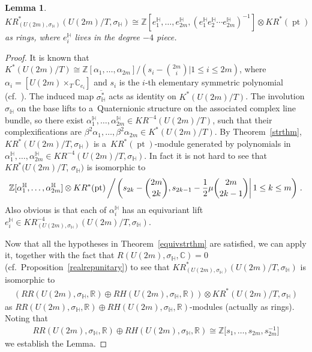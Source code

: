 \documentclass[11pt]{article}
\numberwithin{equation}{section}
\newtheorem{Lemma}[Theorem]{Lemma}
\DeclareMathOperator{\pt}{pt}
\begin{document}
\begin{Lemma}
\label{quatring}
$KR^*_{(U(2m),
\sigma_\mathbb{H})}(U(2m)/T,
\sigma_\mathbb{H})\cong \mathbb{Z}[e_1^\mathbb{H}, \dots, e_{2m}^\mathbb{H}, (e_1^\mathbb{H}e_2^\mathbb{H}\cdots
e_{2m}^\mathbb{H})^{-1}]\otimes KR^*(\pt)$ as rings, where $e_i^\mathbb{H}$ lives in the degree $-4$ piece.
\end{Lemma}
\begin{proof}
It is known that $K^*(U(2m)/T)\cong\mathbb{Z}[\alpha_1, \dots, \alpha_{2m}]/(s_i-\binom{2m}{i}|1\leq i\leq 2m)$, where
$\alpha_i=[U(2m)\times_T\mathbb{C}_{e_i}]$ and $s_i$ is the $i$-th elementary symmetric polynomial (cf.~\cite[Proposition 2.7.13]{At}).
The induced map $\overline{\sigma_\mathbb{H}^*}$ acts as identity on $K^*(U(2m)/T)$.
The involution $\sigma_\mathbb{H}$ on the base lifts to a~Quaternionic structure
on the associated complex line bundle, so there \mbox{exist}
$\alpha_1^\mathbb{H}, \dots, \alpha_{2m}^\mathbb{H}\in KR^{-4}(U(2m)/T)$, such that their complexif\/ications are
$\beta^2\alpha_1, \dots, \beta^2\alpha_{2m}\in K^*(U(2m)/T)$.
By Theorem~\ref{strthm}, $KR^*(U(2m)/T,
\sigma_\mathbb{H})$ is a~$KR^*(\pt)$-module generated by polynomials in $\alpha_1^\mathbb{H}, \dots, \alpha_{2m}^\mathbb{H}\in
KR^{-4}(U(2m)/T,
\sigma_\mathbb{H})$.
In fact it is not hard to see that $KR^*(U(2m)/T$,
$\sigma_\mathbb{H})$ is isomorphic to
\begin{gather*}
\mathbb{Z}[\alpha_1^\mathbb{H}, \dots, \alpha_{2m}^\mathbb{H}]\otimes
KR^*(\pt)\left/\left.\left(s_{2k}-\binom{2m}{2k}, s_{2k-1}-\frac{1}{2}\mu\binom{2m}{2k-1}\right|1\leq k\leq
m\right)\right..
\end{gather*}
Also obvious is that each of $\alpha_i^\mathbb{H}$ has an equivariant lift $e_i^\mathbb{H}\in KR^{-4}_{(U(2m),
\sigma_\mathbb{H})}(U(2m)/T,\sigma_\mathbb{H})$.

Now that all the hypotheses in Theorem~\ref{equivstrthm} are satisf\/ied, we can apply it, together with the fact that
$R(U(2m),
\sigma_\mathbb{H}, \mathbb{C})=0$ (cf.\ Proposition~\ref{realrepunitary}) to see that $KR^*_{(U(2m),
\sigma_\mathbb{H})}(U(2m)/T,
\sigma_\mathbb{H})$ is isomorphic to
\begin{gather*}
(RR(U(2m),
\sigma_\mathbb{H}, \mathbb{R})\oplus RH(U(2m),
\sigma_\mathbb{H}, \mathbb{R}))\otimes KR^*(U(2m)/T,
\sigma_\mathbb{H})
\end{gather*}
as $RR(U(2m),
\sigma_\mathbb{H}, \mathbb{R})\oplus RH(U(2m),
\sigma_\mathbb{H}, \mathbb{R})$-modules (actually as rings).
Noting that
\begin{gather*}
RR(U(2m),\sigma_\mathbb{H}, \mathbb{R})\oplus RH(U(2m),
\sigma_\mathbb{H}, \mathbb{R})\cong\mathbb{Z}\big[s_1, \dots, s_{2m}, s_{2m}^{-1}\big]
\end{gather*}
we establish the Lemma.
\end{proof}
\end{document}
